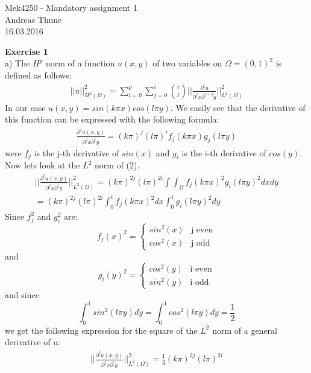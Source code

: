 \documentclass[11pt,a4paper]{report}
\begin{document}
\begin{center}

\LARGE Mek4250 - Mandatory assignment 1
\\
Andreas Thune
\\
\LARGE
16.03.2016

\end{center}
\textbf{Exercise 1}
\\
a) The $H^p$ norm of a function $u(x,y)$ of two variables on $\Omega=(0,1)^2$ is defined as follows: 
\begin{gather}
||u||_{H^p(\Omega)}^2 = \sum_{i=0}^p \sum_{j=0}^{i}\binom {i} {j} ||\frac{\partial^i u}{\partial^j x \partial^{i-j}y}||_{L^2(\Omega)}^2 
\end{gather}
In our case $u(x,y)=sin(k\pi x)cos(l\pi y)$. We easily see that the derivative of this function can be expressed with the following formula: 
\begin{gather}
\frac{\partial^i u(x,y)}{\partial^j x \partial^{i}y} = (k\pi)^j(l\pi)^if_j(k\pi x)g_j(l\pi y)
\end{gather}
were $f_j$ is the j-th derivative of $sin(x)$ and $g_i$ is the i-th derivative of $cos(y)$. Now lets look at the $L^2$ norm of (2).
\begin{gather*}
||\frac{\partial^i u(x,y)}{\partial^j x \partial^{i}y}||_{L^2(\Omega)}^2 = (k\pi)^{2j}(l\pi)^{2i} \int\int_{\Omega} f_j(k\pi x)^2g_i(l\pi y)^2 dxdy \\
= (k\pi)^{2j}(l\pi)^{2i}\int_0^1f_j(k\pi x)^2dx\int_0^1g_i(l\pi y)^2dy
\end{gather*}
Since $f_j^2$ and $g_i^2$ are:
\begin{displaymath}
   f_j(x)^2 = \left\{
     \begin{array}{lr}
       sin^2(x) &  \text{j even} \\
       cos^2(x) &  \text{j odd}
     \end{array}
   \right.
\end{displaymath}
and 
\begin{displaymath}
   g_i(y)^2 = \left\{
     \begin{array}{lr}
       cos^2(y) &  \text{i even} \\
       sin^2(y) &  \text{i odd}
     \end{array}
   \right.
\end{displaymath}
and since $$\int_0^1sin^2(l\pi y)dy=\int_0^1cos^2(l\pi y)dy=\frac{1}{2} $$
we get the following expression for the square of the $L^2$ norm of a general derivative of u:
\begin{gather*}
||\frac{\partial^i u(x,y)}{\partial^j x \partial^{i}y}||_{L^2(\Omega)}^2 = \frac{1}{4}(k\pi)^{2j}(l\pi)^{2i} 
\end{gather*}
\end{document}
